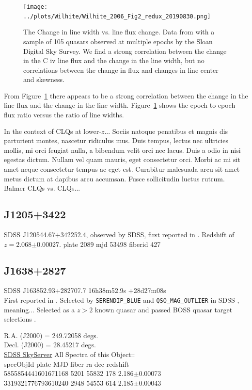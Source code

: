 \documentclass[a4paper,fleqn,usenatbib]{mnras}
\begin{document}
\begin{figure}
  \centering
  \texttt{[image: ../plots/Wilhite/Wilhite\_2006\_Fig2\_redux\_20190830.png]}
   \vspace{-12pt}
  \caption[]{
The Change in \civ line width vs. line flux change. 
Data from \citet{Wilhite2006} with a sample of 105 quasars observed at
multiple epochs by the Sloan Digital Sky Survey. We find a strong
correlation between the change in the C iv line flux and the change in
the line width, but no correlations between the change in flux and
changes in line center and skewness.}
  \label{fig:Wilhite2006_comparison}
\end{figure}
From Figure~\ref{fig:Wilhite2006_comparison} there appears to be a
strong correlation between the change in the line flux and the change
in the line width.  Figure~\ref{fig:Wilhite2006_comparison} shows the
epoch-to-epoch flux ratio versus the ratio of line widths.

In the context of CLQs at lower-$z$...  Sociis natoque penatibus et
magnis dis parturient montes, nascetur ridiculus mus. Duis tempus,
lectus nec ultricies mollis, mi orci feugiat nulla, a bibendum velit
orci nec lacus. Duis a odio in nisi egestas dictum. Nullam vel quam
mauris, eget consectetur orci. Morbi ac mi sit amet neque consectetur
tempus ac eget est. Curabitur malesuada arcu sit amet metus dictum at
dapibus arcu accumsan. Fusce sollicitudin luctus rutrum.  Balmer CLQs
vs. \civ CLQs...


\subsection{J1205+3422 }
SDSS J120544.67+342252.4, observed by SDSS, first reported in \citet{Schneider2007}. 
Redshift of $z=$2.068$\pm$0.00027. 
plate	2089 
mjd	53498
fiberid	427


\subsection{J1638+2827}
SDSS J163852.93+282707.7       16h38m52.9s +28d27m08s  \\
First reported in \citet{Schneider2010}. 
Selected by {\tt SERENDIP\_BLUE} and {\tt QSO\_MAG\_OUTLIER} in SDSS \citep{Richards2002}, meaning...
Selected as a $z>2$ known quasar and passed BOSS quasar target selections \citep{Ross2012}. 


R.A. (J2000) = 249.72058 degs. \\
Decl. (J2000) = 28.45217 degs. \\
\href{skyserver.sdss.org/dr15/en/tools/explore/Summary.aspx?id=1237662301375824232}{SDSS SkyServer} 
All Spectra of this Object:: \\
specObjId	plate	MJD	fiber	ra	dec	redshift \\
5855854441601671168	5201	55832	178	2.186$\pm$0.00073\\
3319321776793610240	2948	54553	614	2.185$\pm$0.00043\\
\end{document}

